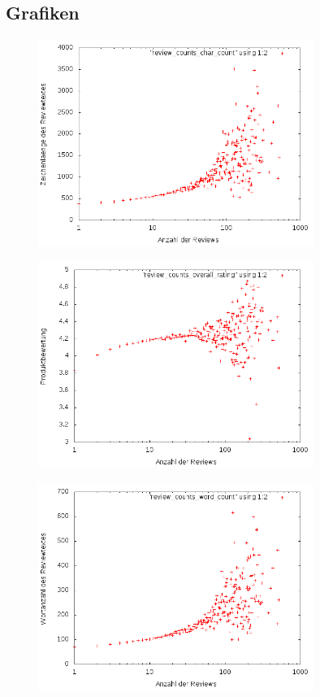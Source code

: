 \documentclass{scrartcl}
\theoremstyle{my_th_style}
\begin{document}
\subsection*{Grafiken}
\begin{figure}[H]
   \includegraphics[width=0.8\textwidth]{_results/char_count2.png}
\end{figure}
\begin{figure}[H]
   \includegraphics[width=0.8\textwidth]{_results/rating_count.png}
\end{figure}
\begin{figure}[H]
   \includegraphics[width=0.8\textwidth]{_results/word_count2.png}
\end{figure}
\end{document}
